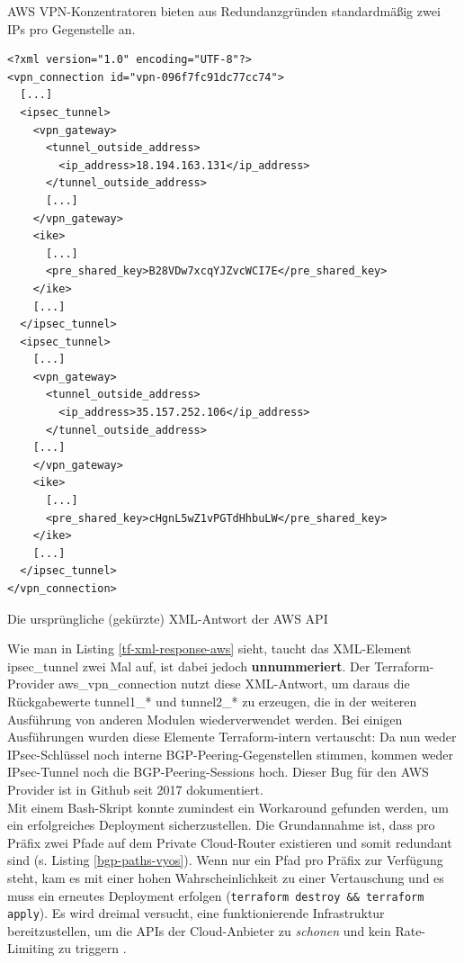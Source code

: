 AWS \gls{VPN-Konzentrator}en bieten aus Redundanzgründen standardmäßig zwei IPs pro Gegenstelle an. 
\begin{listing}[h]
\begin{verbatim}
<?xml version="1.0" encoding="UTF-8"?>
<vpn_connection id="vpn-096f7fc91dc77cc74">
  [...]
  <ipsec_tunnel>
    <vpn_gateway>
      <tunnel_outside_address>
        <ip_address>18.194.163.131</ip_address>
      </tunnel_outside_address>
      [...]
    </vpn_gateway>
    <ike>
      [...]
      <pre_shared_key>B28VDw7xcqYJZvcWCI7E</pre_shared_key>
    </ike>
    [...]
  </ipsec_tunnel>
  <ipsec_tunnel>
    [...]
    <vpn_gateway>
      <tunnel_outside_address>
        <ip_address>35.157.252.106</ip_address>
      </tunnel_outside_address>
    [...]
    </vpn_gateway>
    <ike>
      [...]
      <pre_shared_key>cHgnL5wZ1vPGTdHhbuLW</pre_shared_key>
    </ike>
    [...]
  </ipsec_tunnel>
</vpn_connection>

\end{verbatim}
\caption{Die ursprüngliche (gekürzte) XML-Antwort der AWS API}
\label{tf-xml-response-aws}
\end{listing}\FloatBarrier
Wie man in Listing \ref{tf-xml-response-aws} sieht, taucht das XML-Element ipsec\_tunnel zwei Mal auf, ist dabei jedoch \textbf{unnummeriert}.
Der Terraform-Provider aws\_vpn\_connection nutzt diese XML-Antwort, um daraus die Rückgabewerte tunnel1\_* und tunnel2\_* zu erzeugen\cite{awsattributestf2021}, die in der weiteren Ausführung von anderen Modulen wiederverwendet werden. Bei einigen Ausführungen wurden diese Elemente Terraform-intern vertauscht: Da nun weder IPsec-Schlüssel noch interne BGP-Peering-Gegenstellen stimmen, kommen weder IPsec-Tunnel noch die BGP-Peering-Sessions hoch. Dieser Bug für den AWS Provider ist in Github seit 2017 dokumentiert\cite{githubbugtf2021}.\\
Mit einem Bash-Skript konnte zumindest ein Workaround gefunden werden, um ein erfolgreiches \gls{Deployment} sicherzustellen. Die Grundannahme ist, dass pro Präfix zwei Pfade auf dem Private Cloud-Router existieren und somit redundant sind (s. Listing \ref{bgp-paths-vyos}). Wenn nur ein Pfad pro Präfix zur Verfügung steht, kam es mit einer hohen Wahrscheinlichkeit zu einer Vertauschung und es muss ein erneutes \gls{Deployment} erfolgen (\texttt{terraform destroy \&\& terraform apply}). Es wird dreimal versucht, eine funktionierende Infrastruktur bereitzustellen, um die APIs der Cloud-Anbieter zu \textit{schonen} und kein Rate-Limiting zu triggern \cite{awsthrottling2021}.
